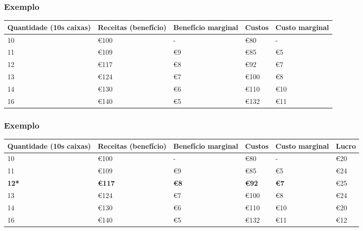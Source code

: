 \begin{frame}
	\frametitle{Exemplo}

	\begin{table}
		\begin{tabular}{p{1.8cm}p{1.8cm}p{1.8cm}p{1.8cm}p{1.8cm}}
			Quantidade (10s caixas) & Receitas (benef\'icio) & Benef\'icio marginal & Custos & Custo marginal \\
			\hline\hline
			10 & \euro 100 & - & \euro 80 & - \\
			11 & \euro 109 & \euro 9 & \euro 85 & \euro 5 \\
			12 & \euro 117 & \euro 8 & \euro 92 & \euro 7 \\
			13 & \euro 124 & \euro 7 & \euro 100 & \euro 8 \\
			14 & \euro 130 & \euro 6 & \euro 110 & \euro 10 \\
			16 & \euro 140 & \euro 5 & \euro 132 & \euro 11
		\end{tabular}
	\end{table}
\end{frame}


\begin{frame}
	\frametitle{Exemplo}

	\begin{table}
		\begin{tabular}{p{1.6cm}p{1.6cm}p{1.6cm}p{1.6cm}p{1.6cm}p{1.6cm}}
			Quantidade (10s caixas) & Receitas (benef\'icio) & Benef\'icio marginal & Custos & Custo marginal & Lucro \\
			\hline\hline
			10 & \euro 100 & - & \euro 80 & - & \euro 20\\
			11 & \euro 109 & \euro 9 & \euro 85 & \euro 5  & \euro 24 \\
			\textbf{12*} & \textbf{\euro 117} & \textbf{\euro 8} & \textbf{\euro 92} & \textbf{\euro 7} & \euro 25 \\
			13 & \euro 124 & \euro 7 & \euro 100 & \euro 8 & \euro 24 \\
			14 & \euro 130 & \euro 6 & \euro 110 & \euro 10 & \euro 20 \\
			16 & \euro 140 & \euro 5 & \euro 132 & \euro 11 & \euro 12
		\end{tabular}
	\end{table}
\end{frame}


